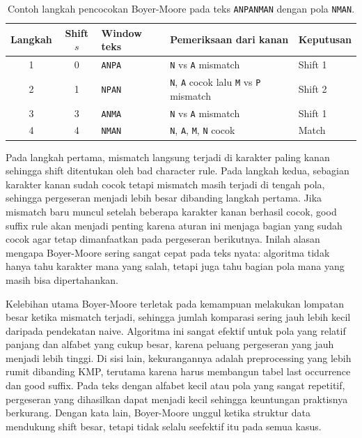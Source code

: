 \begin{table}[H]
    \centering
    \caption{Contoh langkah pencocokan Boyer-Moore pada teks \texttt{ANPANMAN} dengan pola \texttt{NMAN}.}
    \small
    \setlength{\tabcolsep}{4pt}
    \begin{tabularx}{\textwidth}{c c >{\raggedright\arraybackslash}p{2.2cm} >{\raggedright\arraybackslash}X >{\raggedright\arraybackslash}p{2.7cm}}
        \toprule
        Langkah & Shift $s$ & Window teks   & Pemeriksaan dari kanan                                              & Keputusan \\
        \midrule
        1       & 0         & \texttt{ANPA} & \texttt{N} vs \texttt{A} mismatch                                   & Shift 1   \\
        2       & 1         & \texttt{NPAN} & \texttt{N}, \texttt{A} cocok lalu \texttt{M} vs \texttt{P} mismatch & Shift 2   \\
        3       & 3         & \texttt{ANMA} & \texttt{N} vs \texttt{A} mismatch                                   & Shift 1   \\
        4       & 4         & \texttt{NMAN} & \texttt{N}, \texttt{A}, \texttt{M}, \texttt{N} cocok                & Match     \\
        \bottomrule
    \end{tabularx}
\end{table}

Pada langkah pertama, mismatch langsung terjadi di karakter paling kanan sehingga shift ditentukan oleh bad character rule. Pada langkah kedua, sebagian karakter kanan sudah cocok tetapi mismatch masih terjadi di tengah pola, sehingga pergeseran menjadi lebih besar dibanding langkah pertama. Jika mismatch baru muncul setelah beberapa karakter kanan berhasil cocok, good suffix rule akan menjadi penting karena aturan ini menjaga bagian yang sudah cocok agar tetap dimanfaatkan pada pergeseran berikutnya. Inilah alasan mengapa Boyer-Moore sering sangat cepat pada teks nyata: algoritma tidak hanya tahu karakter mana yang salah, tetapi juga tahu bagian pola mana yang masih bisa dipertahankan.

Kelebihan utama Boyer-Moore terletak pada kemampuan melakukan lompatan besar ketika mismatch terjadi, sehingga jumlah komparasi sering jauh lebih kecil daripada pendekatan naive. Algoritma ini sangat efektif untuk pola yang relatif panjang dan alfabet yang cukup besar, karena peluang pergeseran yang jauh menjadi lebih tinggi. Di sisi lain, kekurangannya adalah preprocessing yang lebih rumit dibanding KMP, terutama karena harus membangun tabel last occurrence dan good suffix. Pada teks dengan alfabet kecil atau pola yang sangat repetitif, pergeseran yang dihasilkan dapat menjadi kecil sehingga keuntungan praktisnya berkurang. Dengan kata lain, Boyer-Moore unggul ketika struktur data mendukung shift besar, tetapi tidak selalu seefektif itu pada semua kasus.

